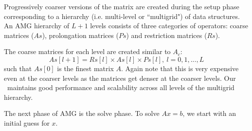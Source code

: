 Progressively coarser versions of the matrix are created during the setup phase corresponding to
a hierarchy (i.e. multi-level or ``multigrid") of data structures.
An AMG hierarchy of $L+1$ levels consists of three categories of operators:
coarse matrices ($As$), prolongation matrices ($Ps$) and restriction matrices ($Rs$).


The coarse matrices for each level are created similar to $A_c$:
\begin{equation*}
 As[l+1] = Rs[l] \times As[l] \times Ps[l],\ l = 0, 1, ..., L
\end{equation*}
such that $As[0]$ is the finest matrix $A$. Again note that this is very expensive even at the coarser levels as the matrices get denser at the coarser levels. Our \mm\ maintains good performance and scalability across all levels of the multigrid hierarchy. 

The next phase of AMG is the solve phase. To solve $Ax = b$, we start with an initial guess for $x$.



